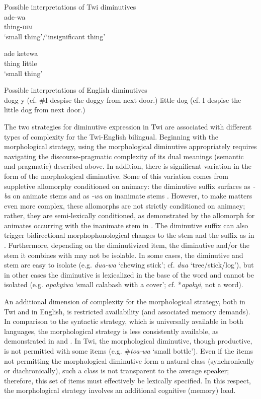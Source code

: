 \documentclass[output=paper,colorlinks,citecolor=brown]{langscibook}
\begin{document}
\ea \label{DiscPragTwi}Possible interpretations of Twi diminutives\\
\ea
\gll \label{ex:adewa}ade-wa \\
thing-\textsc{dim} \\ 
\glt `small thing'/`insignificant thing'

\ex
\gll \label{ex:ade-ketewa}ade ketewa \\
thing little \\
\glt `small thing'
\z

\ex \label{DiscPragEng}Possible interpretations of English diminutives\\
\ea \label{ex:doggy}dogg-y (cf. \#I despise the doggy from next door.)
\ex \label{ex:little-dog}little dog (cf. I despise the little dog from next door.)
\z
\z

The two strategies for diminutive expression in Twi are associated with different types of complexity for the Twi-English bilingual. Beginning with the morphological strategy, using the morphological diminutive appropriately requires navigating the discourse-pragmatic complexity of its dual meanings (semantic and pragmatic) described above. In addition, there is significant variation in the form of the morphological diminutive. Some of this variation comes from suppletive allomorphy conditioned on animacy: the diminutive suffix surfaces as \textit{-ba} on animate stems and as \textit{-wa} on inanimate stems \citep{AppahAmfo2011}. However, to make matters even more complex, these allomorphs are not strictly conditioned on animacy; rather, they are semi-lexically conditioned, as demonstrated by the allomorph for animates occurring with the inanimate stem in . The diminutive suffix can also trigger bidirectional morphophonological changes to the stem and the suffix \citep{Dolphyne1988, Agyekum2010, AppahAmfo2011} as in . Furthermore, depending on the diminutivized item, the diminutive and/or the stem it combines with may not be isolable. In some cases, the diminutive and stem are easy to isolate (e.g. \textit{dua-wa} `chewing stick'; cf. \textit{dua} `tree/stick/log'), but in other cases the diminutive is lexicalized in the base of the word and cannot be isolated (e.g. \textit{apakyiwa} `small calabash with a cover'; cf. *\textit{apakyi}, not a word).

An additional dimension of complexity for the morphological strategy, both in Twi and in English, is restricted availability (and associated memory demands). In comparison to the syntactic strategy, which is universally available in both languages, the morphological strategy is less consistently available, as demonstrated in  and . In Twi, the morphological diminutive, though productive, is not permitted with some items (e.g. \#\textit{toa-wa} `small bottle'). Even if the items not permitting the morphological diminutive form a natural class (synchronically or diachronically), such a class is not transparent to the average speaker; therefore, this set of items must effectively be lexically specified. In this respect, the morphological strategy involves an additional cognitive (memory) load.
\end{document}
